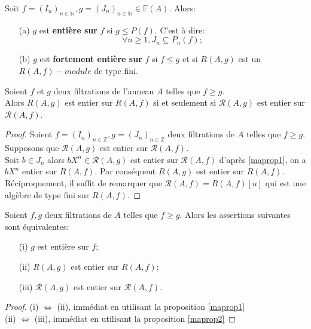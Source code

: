 \begin{madefinition}
	Soit $f=(I_n)_{n \in \mathbb{N}} , g = (J_n)_{n \in \mathbb{N}}\in \mathbb{F}(A)$.  Alors:\\
	\begin{enumerate}
		\item[(a)]$g$ est \textbf{entière sur} $f$ si $g \leqslant P(f)$. C'est à dire:
		\[\forall n \geqslant 1, J_n \subseteq P_{n}(f); \]
		\item[(b)]$g$ est \textbf{fortement entière sur} $f$ si $f \leqslant g$ et si $R(A,g)$ est un $R(A,f)-module$ de type fini.
	\end{enumerate}
\end{madefinition}
\begin{maproposition}
	\label{maprop2}
	Soient $f$ et $g$ deux filtrations de l'anneau $A$ telles que $f \geqslant g$.\\ Alors $R(A,g)$ est entier sur $R(A,f)$ si et seulement si $\mathcal{R}(A,g)$ est entier sur $\mathcal{R}(A,f)$. 
\end{maproposition}
\begin{proof}
	Soient $f=(I_n)_{n \in \mathbb{Z}},g=(J_n)_{n \in \mathbb{Z}}$ deux filtrations de $A$ telles que $f \geqslant g$. \\ Supposons que $\mathcal{R}(A,g)$ est entier sur $\mathcal{R}(A,f)$. \\
	Soit $b \in J_n$ alors $bX^n \in \mathcal{R}(A,g)$ est entier sur $\mathcal{R}(A,f)$ d'après \ref{maprop1}, on a $bX^n$ entier sur $R(A,f)$. Par conséquent $R(A,g)$ est entier sur $R(A,f)$.
	Réciproquement, il suffit de remarquer que $\mathcal{R}(A,f)=R(A,f)[u]$ qui est une algèbre de type fini sur $R(A,f)$.
\end{proof}
\begin{maproposition}
	Soient $f,g$ deux filtrations de $A$ telles que $f \geqslant g$. Alors les assertions suivantes sont équivalentes:
	\begin{enumerate}
		\item[(i)] $g$ est entière sur $f$;
		\item[(ii)] $R(A,g)$ est entier sur $R(A,f)$;
		\item[(iii)] $\mathcal{R}(A,g)$ est entier sur $\mathcal{R}(A,f)$.
	\end{enumerate}
\end{maproposition}
\begin{proof}
	(i) $\Longleftrightarrow$ (ii), immédiat en utilisant la proposition \ref{maprop1} \\
	(ii) $\Longleftrightarrow$ (iii), immédiat en utilisant la proposition \ref{maprop2}
\end{proof}
